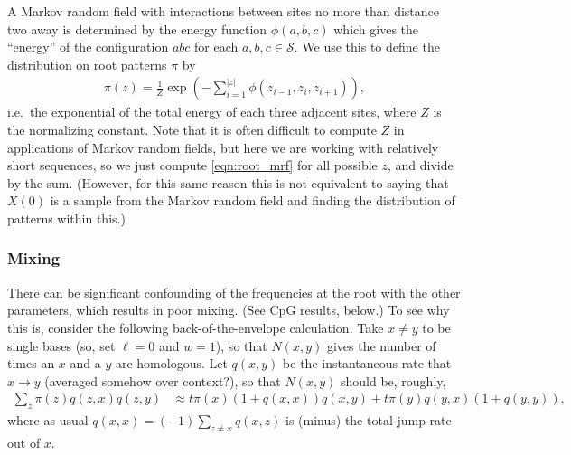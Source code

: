 \documentclass{article}
\newcommand{\calS}{\mathcal{S}}  %
\theoremstyle{plain}
\theoremstyle{definition}
\begin{document}
A Markov random field with interactions between sites no more than distance two away
is determined by the energy function $\phi(a,b,c)$ which gives the ``energy'' of the configuration $abc$ for each $a,b,c \in \calS$.
We use this to define the distribution on root patterns $\pi$ by
\begin{align}  \label{eqn:root_mrf}
    \pi(z) = \frac{1}{Z} \exp\left( - \sum_{i=1}^{|z|} \phi(z_{i-1},z_i,z_{i+1}) \right),
\end{align}
i.e.\ the exponential of the total energy of each three adjacent sites,
where $Z$ is the normalizing constant.
Note that it is often difficult to compute $Z$ in applications of Markov random fields,
but here we are working with relatively short sequences,
so we just compute \eqref{eqn:root_mrf} for all possible $z$, and divide by the sum.
(However, for this same reason this is not equivalent to saying that $X(0)$ is a sample from the Markov random field
and finding the distribution of patterns within this.)


\subsubsection{Mixing}

There can be significant confounding of the frequencies at the root with the other parameters,
which results in poor mixing.
(See CpG results, below.)
To see why this is, consider the following back-of-the-envelope calculation.
Take $x \neq y$ to be single bases (so, set $\ell=0$ and $w=1$),
so that $N(x,y)$ gives the number of times an $x$ and a $y$ are homologous.
Let $q(x,y)$ be the instantaneous rate that $x \to y$ (averaged somehow over context?),
so that $N(x,y)$ should be, roughly,
\begin{align*}
  \sum_z \pi(z) q(z,x) q(z,y) &\approx t \pi(x) (1+q(x,x)) q(x,y) + t \pi(y) q(y,x) (1+q(y,y)) ,
\end{align*}
where as usual $q(x,x) = (-1) \sum_{z \neq x} q(x,z)$ is (minus) the total jump rate out of $x$.
\end{document}

